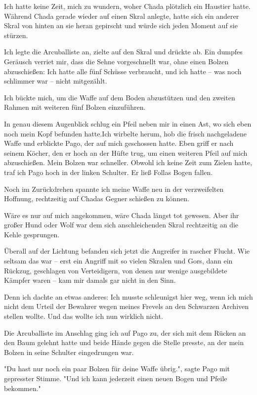\documentclass[10pt, a4paper, oneside]{book}
\begin{document}
\begin{multicols}{2}
Ich hatte keine Zeit, mich zu wundern, woher Chada plötzlich ein Haustier hatte. Während Chada gerade wieder auf einen Skral anlegte, hatte sich ein anderer Skral von hinten an sie heran gepirscht und würde sich jeden Moment auf sie stürzen.

Ich legte die Arcuballiste an, zielte auf den Skral und drückte ab. Ein dumpfes Geräusch verriet mir, dass die Sehne vorgeschnellt war, ohne einen Bolzen abzuschießen: Ich hatte alle fünf Schüsse verbraucht, und ich hatte – was noch schlimmer war – nicht mitgezählt.

Ich bückte mich, um die Waffe auf dem Boden abzustützen und den zweiten Rahmen mit weiteren fünf Bolzen einzuführen.

In genau diesem Augenblick schlug ein Pfeil neben mir in einen Ast, wo sich eben noch mein Kopf befunden hatte.Ich wirbelte herum, hob die frisch nachgeladene Waffe und erblickte Pago, der auf mich geschossen hatte. Eben griff er nach seinem Köcher, den er hoch an der Hüfte trug, um einen weiteren Pfeil auf mich abzuschießen. Mein Bolzen war schneller. Obwohl ich keine Zeit zum Zielen hatte, traf ich Pago hoch in der linken Schulter. Er ließ Follas Bogen fallen.

Noch im Zurückdrehen spannte ich meine Waffe neu in der verzweifelten Hoffnung, rechtzeitig auf Chadas Gegner schießen zu können.

Wäre es nur auf mich angekommen, wäre Chada längst tot gewesen. Aber ihr großer Hund oder Wolf war dem sich anschleichenden Skral rechtzeitig an die Kehle gesprungen.

Überall auf der Lichtung befanden sich jetzt die Angreifer in rascher Flucht. Wie seltsam das war – erst ein Angriff mit so vielen Skralen und Gors, dann ein Rückzug, geschlagen von Verteidigern, von denen nur wenige ausgebildete Kämpfer waren – kam mir damals gar nicht in den Sinn.

Denn ich dachte an etwas anderes: Ich musste schleunigst hier weg, wenn ich mich nicht dem Urteil der Bewahrer wegen meines Frevels an den Schwarzen Archiven stellen wollte. Und das wollte ich nun wirklich nicht.

Die Arcuballiste im Anschlag ging ich auf Pago zu, der sich mit dem Rücken an den Baum gelehnt hatte und beide Hände gegen die Stelle presste, an der mein Bolzen in seine Schulter eingedrungen war.

"Du hast nur noch ein paar Bolzen für deine Waffe übrig.", sagte Pago mit gepresster Stimme. "Und ich kann jederzeit einen neuen Bogen und Pfeile bekommen."


\end{multicols}
\end{document}
